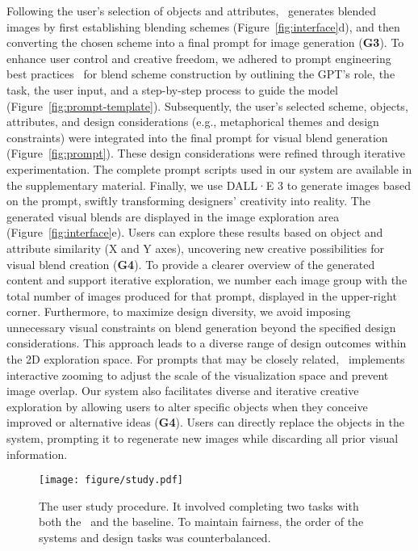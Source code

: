 Following the user's selection of objects and attributes, \sysname\ generates blended images by first establishing blending schemes (Figure~\ref{fig:interface}d), and then converting the chosen scheme into a final prompt for image generation (\textbf{G3}).
To enhance user control and creative freedom, we adhered to prompt engineering best practices~\cite{Prompten79:online, doi:10.1080/10875301.2023.2227621} for blend scheme construction by outlining the GPT's role, the task, the user input, and a step-by-step process to guide the model (Figure~\ref{fig:prompt-template}).
Subsequently, the user's selected scheme, objects, attributes, and design considerations (e.g., metaphorical themes and design constraints) were integrated into the final prompt for visual blend generation (Figure~\ref{fig:prompt}). 
These design considerations were refined through iterative experimentation.
The complete prompt scripts used in our system are available in the supplementary material.
Finally, we use DALL·E 3 to generate images based on the prompt, swiftly transforming designers' creativity into reality.
The generated visual blends are displayed in the image exploration area (Figure~\ref{fig:interface}e). 
Users can explore these results based on object and attribute similarity (X and Y axes), uncovering new creative possibilities for visual blend creation (\textbf{G4}).
To provide a clearer overview of the generated content and support iterative exploration, we number each image group with the total number of images produced for that prompt, displayed in the upper-right corner.
Furthermore, to maximize design diversity, we avoid imposing unnecessary visual constraints on blend generation beyond the specified design considerations. 
This approach leads to a diverse range of design outcomes within the 2D exploration space.
For prompts that may be closely related, \sysname\ implements interactive zooming to adjust the scale of the visualization space and prevent image overlap.
Our system also facilitates diverse and iterative creative exploration by allowing users to alter specific objects when they conceive improved or alternative ideas (\textbf{G4}). Users can directly replace the objects in the system, prompting it to regenerate new images while discarding all prior visual information.




\begin{figure*}[t]
  \centering
  \texttt{[image: figure/study.pdf]}
  \caption{The user study procedure. It involved completing two tasks with both the \sysname\ and the baseline. To maintain fairness, the order of the systems and design tasks was counterbalanced.
  }
  \label{fig:study}
\end{figure*}

